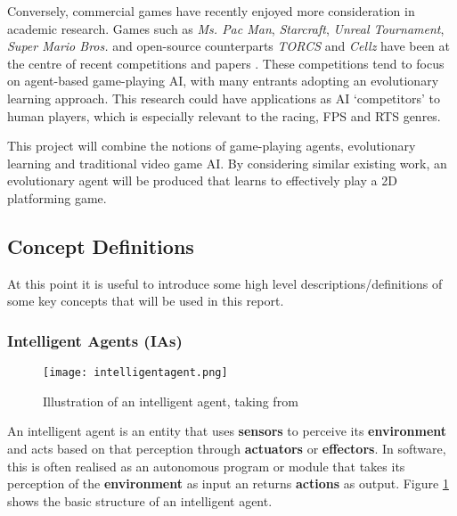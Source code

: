 Conversely, commercial games have recently enjoyed more consideration in academic research. Games such as \emph{Ms. Pac Man}, \emph{Starcraft}, \emph{Unreal Tournament}, \emph{Super Mario Bros.} and open-source counterparts \emph{TORCS} \cite{torcs} and \emph{Cellz} \cite{cellz} have been at the centre of recent competitions and papers \cite{panorama} \cite{marioaicomp}. These competitions tend to focus on agent-based game-playing AI, with many entrants adopting an evolutionary learning approach. This research could have applications as AI `competitors' to human players, which is especially relevant to the racing, FPS and RTS genres.

This project will combine the notions of game-playing agents, evolutionary learning and traditional video game AI. By considering similar existing work, an evolutionary agent will be produced that learns to effectively play a 2D platforming game.


\subsection{Concept Definitions}
\label{subsec:concepts}

At this point it is useful to introduce some high level descriptions/definitions of some key concepts that will be used in this report.

\subsubsection{Intelligent Agents (IAs)}

\begin{figure}[t]
	\centering
	\texttt{[image: intelligentagent.png]}
	\caption{Illustration of an intelligent agent, taking from \cite[p.~32]{modernai1}}
	\label{fig:ia}
\end{figure}

An intelligent agent is an entity that uses \textbf{sensors} to perceive its \textbf{environment} and acts based on that perception through \textbf{actuators} or \textbf{effectors}. In software, this is often realised as an autonomous program or module that takes its perception of the \textbf{environment} as input an returns \textbf{actions} as output. Figure \ref{fig:ia} shows the basic structure of an intelligent agent. \cite[p.~34]{modernai3}


